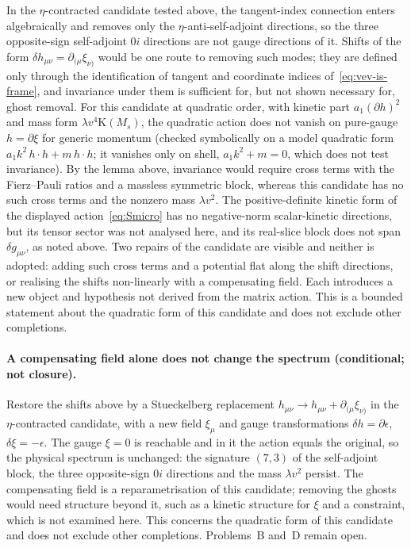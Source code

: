In the \(\eta\)-contracted candidate tested above, the tangent-index
connection enters algebraically and removes only the \(\eta\)-anti-self-adjoint
directions, so the three opposite-sign self-adjoint \(0i\) directions are not
gauge directions of it.  Shifts of the form
\(\delta h_{\mu\nu}=\partial_{(\mu}\xi_{\nu)}\) would be one route to
removing such modes; they are defined only through the identification of
tangent and coordinate indices of~\eqref{eq:vev-is-frame}, and invariance
under them is sufficient for, but not shown necessary for, ghost removal.  For
this candidate at quadratic order, with kinetic part \(a_1(\partial h)^2\) and
mass form \(\lambda v^{4}\mathrm{K}(M_s)\), the quadratic action does not
vanish on pure-gauge \(h=\partial\xi\) for generic momentum (checked
symbolically on a model quadratic form \(a_1k^2\,h\!\cdot\!h+m\,h\!\cdot\!h\);
it vanishes only on shell, \(a_1k^2+m=0\), which does not test invariance).
By the lemma above, invariance would require cross terms with the
Fierz--Pauli ratios and a massless symmetric block, whereas this candidate has
no such cross terms and the nonzero mass \(\lambda v^2\).  The
positive-definite kinetic form of the displayed action~\eqref{eq:Smicro} has
no negative-norm scalar-kinetic directions, but its tensor sector was not
analysed here, and its real-slice block does not span \(\delta g_{\mu\nu}\),
as noted above.  Two repairs of the candidate are visible and neither is
adopted: adding such cross terms and a potential flat along the shift
directions, or realising the shifts non-linearly with a compensating field.
Each introduces a new object and hypothesis not derived from the matrix
action.  This is a bounded statement about the quadratic form of this
candidate and does not exclude other completions.

\paragraph{A compensating field alone does not change the spectrum
(conditional; not closure).}
Restore the shifts above by a Stueckelberg replacement
\(h_{\mu\nu}\to h_{\mu\nu}+\partial_{(\mu}\xi_{\nu)}\) in the \(\eta\)-contracted
candidate, with a new field \(\xi_\mu\) and gauge transformations
\(\delta h=\partial\epsilon\), \(\delta\xi=-\epsilon\).  The gauge \(\xi=0\) is
reachable and in it the action equals the original, so the physical spectrum
is unchanged: the signature \((7,3)\) of the self-adjoint block, the three
opposite-sign \(0i\) directions and the mass \(\lambda v^2\) persist.  The
compensating field is a reparametrisation of this candidate; removing the
ghosts would need structure beyond it, such as a kinetic structure for
\(\xi\) and a constraint, which is not examined here.  This concerns the
quadratic form of this candidate and does not exclude other completions.
Problems~B and~D remain open.

